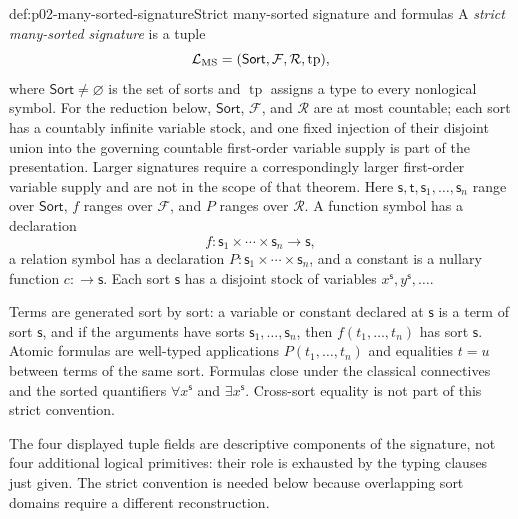 \begin{hbdefinition}{def:p02-many-sorted-signature}{Strict many-sorted signature and formulas}
A \emph{strict many-sorted signature} is a tuple
\[
 \mathcal{L}_{\mathrm{MS}}
   =(\mathsf{Sort},\mathcal F,\mathcal R,\operatorname{tp}),
\]
where \(\mathsf{Sort}\ne\varnothing\) is the set of sorts and
\(\operatorname{tp}\) assigns a type to every nonlogical symbol.  For the
reduction below, \(\mathsf{Sort}\), \(\mathcal F\), and \(\mathcal R\) are at
most countable; each sort has a countably infinite variable stock, and one
fixed injection of their disjoint union into the governing countable
first-order variable supply is part of the presentation.  Larger signatures
require a correspondingly larger first-order variable supply and are not in
the scope of that theorem.  Here
\(\mathsf s,\mathsf t,\mathsf s_1,\ldots,\mathsf s_n\) range over
\(\mathsf{Sort}\), \(f\) ranges over
\(\mathcal F\), and \(P\) ranges over \(\mathcal R\).  A function symbol has
a declaration
\[
 f:\mathsf s_1\times\cdots\times\mathsf s_n\longrightarrow\mathsf s,
\]
a relation symbol has a declaration
\(P:\mathsf s_1\times\cdots\times\mathsf s_n\), and a constant is a nullary
function \(c:\longrightarrow\mathsf s\).  Each sort \(\mathsf s\) has a
disjoint stock of variables \(x^{\mathsf s},y^{\mathsf s},\ldots\).

Terms are generated sort by sort: a variable or constant declared at
\(\mathsf s\) is a term of sort \(\mathsf s\), and if the arguments have sorts
\(\mathsf s_1,\ldots,\mathsf s_n\), then \(f(t_1,\ldots,t_n)\) has sort
\(\mathsf s\).  Atomic formulas are well-typed
applications \(P(t_1,\ldots,t_n)\) and equalities \(t=u\) between terms of
the same sort.  Formulas close under the classical connectives and the sorted
quantifiers \(\forall x^{\mathsf s}\) and \(\exists x^{\mathsf s}\).
Cross-sort equality is not part of this strict convention.
\end{hbdefinition}

The four displayed tuple fields are descriptive components of the signature,
not four additional logical primitives: their role is exhausted by the typing
clauses just given.  The strict convention is needed below because overlapping
sort domains require a different reconstruction.


